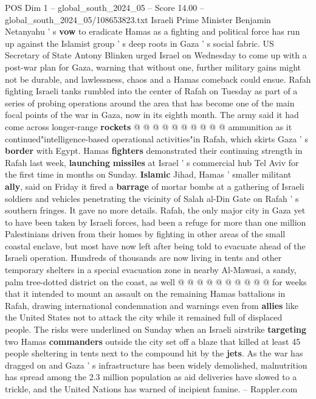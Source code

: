 \begin{textsample}{POS Dim 1 – global\_south\_2024\_05 – Score 14.00 – global\_south\_2024\_05/108653823.txt}
Israeli Prime Minister Benjamin Netanyahu ' s \textbf{vow} to eradicate Hamas as a fighting and political force has run up against the Islamist group ' s deep roots in Gaza ' s social fabric.
US Secretary of State Antony Blinken urged Israel on Wednesday to come up with a post-war plan for Gaza, warning that without one, further military gains might not be durable, and lawlessness, chaos and a Hamas comeback could ensue.
Rafah fighting Israeli tanks rumbled into the center of Rafah on Tuesday as part of a series of probing operations around the area that has become one of the main focal points of the war in Gaza, now in its eighth month.
The army said it had come across longer-range \textbf{rockets} @ @ @ @ @ @ @ @ @ @ ammunition as it continued"intelligence-based operational activities"in Rafah, which skirts Gaza ' s \textbf{border} with Egypt.
Hamas \textbf{fighters} demonstrated their continuing strength in Rafah last week, \textbf{launching} \textbf{missiles} at Israel ' s commercial hub Tel Aviv for the first time in months on Sunday. \textbf{Islamic} Jihad, Hamas ' smaller militant \textbf{ally}, said on Friday it fired a \textbf{barrage} of mortar bombs at a gathering of Israeli soldiers and vehicles penetrating the vicinity of Salah al-Din Gate on Rafah ' s southern fringes.
It gave no more details.
Rafah, the only major city in Gaza yet to have been taken by Israeli forces, had been a refuge for more than one million Palestinians driven from their homes by fighting in other areas of the small coastal enclave, but most have now left after being told to evacuate ahead of the Israeli operation.
Hundreds of thousands are now living in tents and other temporary shelters in a special evacuation zone in nearby Al-Mawasi, a sandy, palm tree-dotted district on the coast, as well @ @ @ @ @ @ @ @ @ @ for weeks that it intended to mount an assault on the remaining Hamas battalions in Rafah, drawing international condemnation and warnings even from \textbf{allies} like the United States not to attack the city while it remained full of displaced people.
The risks were underlined on Sunday when an Israeli airstrike \textbf{targeting} two Hamas \textbf{commanders} outside the city set off a blaze that killed at least 45 people sheltering in tents next to the compound hit by the \textbf{jets}.
As the war has dragged on and Gaza ' s infrastructure has been widely demolished, malnutrition has spread among the 2.3 million population as aid deliveries have slowed to a trickle, and the United Nations has warned of incipient famine. -- Rappler.com

\end{textsample}
